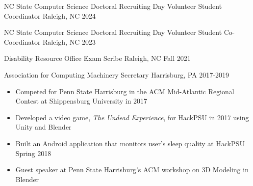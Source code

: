 

\begin{cvhonors}
  \cvhonor
    {NC State Computer Science Doctoral Recruiting Day} %
    {Volunteer Student Coordinator} %
    {Raleigh, NC} %
    {2024} %

  \cvhonor
    {NC State Computer Science Doctoral Recruiting Day} %
    {Volunteer Student Co-Coordinator} %
    {Raleigh, NC} %
    {2023} %

  \cvhonor
    {Disability Resource Office} %
    {Exam Scribe} %
    {Raleigh, NC} %
    {Fall 2021} %
    
  \cvhonor
    {Association for Computing Machinery} %
    {Secretary} %
    {Harrisburg, PA} %
    {2017-2019} %
    
\end{cvhonors}




\begin{small} \color{black}

\begin{itemize}
    \setlength\itemsep{-0.25em}
    \item Competed for Penn State Harrisburg in the ACM Mid-Atlantic Regional Contest at Shippensburg University in 2017
    \item Developed a video game, \textit{The Undead Experience}, for HackPSU in 2017 using Unity and Blender
    \item Built an Android application that monitors user's sleep quality at HackPSU Spring 2018 
    \item Guest speaker at Penn State Harrisburg's ACM workshop on 3D Modeling in Blender
\end{itemize}
\end{small}

